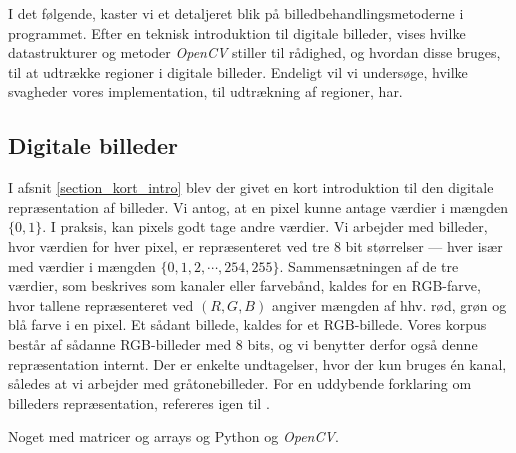 {
{\sffamily I det følgende, kaster vi et detaljeret blik på
billedbehandlingsmetoderne i programmet. Efter en teknisk
introduktion til digitale billeder, vises hvilke datastrukturer og
metoder \emph{OpenCV} stiller til rådighed, og hvordan disse bruges, til
at udtrække regioner i digitale billeder. Endeligt vil vi undersøge,
hvilke svagheder vores implementation, til udtrækning af regioner, har.
}

\subsection{Digitale billeder}
I afsnit \ref{section_kort_intro} blev der givet en kort introduktion
til den digitale repræsentation af billeder. Vi antog, at en pixel kunne
antage værdier i mængden $\{0, 1\}$. I praksis, kan pixels godt tage
andre værdier. Vi arbejder med billeder, hvor værdien for hver pixel, er
repræsenteret ved tre 8 bit størrelser --- hver især med værdier i
mængden $\{0, 1, 2, \cdots, 254, 255\}$. Sammensætningen af de tre
værdier, som beskrives som kanaler eller farvebånd, kaldes for en
RGB-farve, hvor tallene repræsenteret ved $(R,G,B)$ angiver mængden af
hhv. rød, grøn og blå farve i en pixel. Et sådant billede, kaldes for et
RGB-billede. Vores korpus består af sådanne RGB-billeder med 8 bits, og
vi benytter derfor også denne repræsentation internt. Der er enkelte
undtagelser, hvor der kun bruges én kanal, således at vi arbejder med
gråtonebilleder. For en uddybende forklaring om billeders
repræsentation, refereres igen til \cite{SIOlsen}.

Noget med matricer og arrays og Python og \emph{OpenCV}.

}
